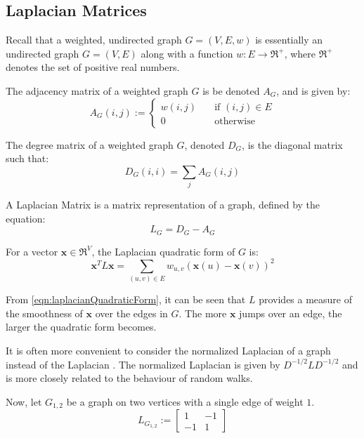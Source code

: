 \subsection{Laplacian Matrices}
\label{sec:laplacianMatrices}
\nocite{Berkeley:1999,Pati:2011,Spielman:2006}
Recall that a weighted, undirected graph $G = (V,E,w)$ is essentially an 
undirected graph $G = (V,E)$ along with a function $w : E \rightarrow 
\Re^{+}$, where $\Re^{+}$ denotes the set of positive real numbers.

The adjacency matrix of a weighted graph $G$ is be denoted $A_{G}$, and is
given by:
\begin{equation}
A_{G}(i,j) := 
    \left\{
        \begin{array}{ll}
            \mathit{w}(i,j) &   \quad \text{if $(i,j) \in E$} \\
            0 &                 \quad \text{otherwise}
        \end{array}
    \right.
\end{equation}

The degree matrix of a weighted graph $G$, denoted $D_{G}$, is the diagonal 
matrix such that:
\begin{equation}
D_{G}(i,i) = \sum_{j} A_{G}(i,j)
\end{equation}

A Laplacian Matrix is a matrix representation of a graph, defined by the
equation:
\begin{equation}
L_{G} = D_{G} - A_{G}
\end{equation}

For a vector $\textbf{x} \in \Re^{V}$, the Laplacian quadratic form of $G$ is:
\begin{equation}
\label{eqn:laplacianQuadraticForm}
\textbf{x}^{T} L \textbf{x} = \sum_{(u,v) \in E} w_{u,v}(\textbf{x}(u) - \textbf{x}(v))^2
\end{equation}

From \autoref{eqn:laplacianQuadraticForm}, it can be seen that $L$ provides a 
measure of the smoothness of $\textbf{x}$ over the edges in $G$. The more 
$\textbf{x}$ jumps over an edge, the larger the quadratic form becomes.

It is often more convenient to consider the normalized Laplacian of a graph 
instead of the Laplacian \cite{Spielman:2010}. The normalized Laplacian is given
by $D^{-1/2}LD^{-1/2}$ and is more closely related to the behaviour of random 
walks.

Now, let $G_{1,2}$ be a graph on two vertices with a single edge of weight $1$.
\begin{equation}
L_{G_{1,2}} :=
    \begin{bmatrix}
        1 & -1 \\
        -1 & 1
    \end{bmatrix}
\end{equation}

